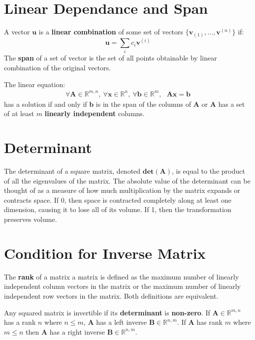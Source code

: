\documentclass[12pt]{report}
\begin{document}
    \section{Linear Dependance and Span}
        A vector $\boldsymbol{u}$ is a \textbf{linear combination} of some set of vectors $\{\boldsymbol{v}_{(1)}, \dots, \boldsymbol{v}^{(n)}\}$ if:
        \begin{equation}
            \boldsymbol{u} = \sum_{i}{c_i \boldsymbol{v}^(i)}
        \end{equation}
        The \textbf{span} of a set of vector is the set of all points obtainable by linear combination of the original vectors.
        
        The linear equation:
        \begin{align}
            \forall \boldsymbol{A} \in \mathbb{R}^{m,n},~
            \forall \boldsymbol{x} \in \mathbb{R}^{n},~ \forall \boldsymbol{b} \in \mathbb{R}^{m},~~~\boldsymbol{A}\boldsymbol{x} = \boldsymbol{b}
        \end{align}
        has a solution if and only if $\boldsymbol{b}$ is in the span of the columns of $\boldsymbol{A}$ or $\boldsymbol{A}$ has a set of at least $m$ \textbf{linearly independent} columns.
        
    \section{Determinant}
        The determinant of a square matrix, denoted $\textbf{det}(\boldsymbol{A})$, is equal to the product of all the eigenvalues of the matrix. The absolute value of the determinant can be thought of as a measure of how much multiplication by the matrix expands or contracts space. If 0, then space is contracted completely along at least one dimension, causing it to lose all of its volume. If 1, then the transformation preserves volume.

    
    \section{Condition for Inverse Matrix}    
        The \textbf{rank} of a matrix a matrix is defined as the maximum number of linearly independent column vectors in the matrix or the maximum number of linearly independent row vectors in the matrix. Both definitions are equivalent.
        
        Any squared matrix is invertible if its \textbf{determinant} is \textbf{non-zero}.
        If $\boldsymbol{A} \in \mathbb{R}^{m,n}$ has a rank $n$ where $n \leq m$, $\boldsymbol{A}$ has a left inverse $\boldsymbol{B} \in \mathbb{R}^{n,m}$. If $\boldsymbol{A}$ has rank $m$ where $m \leq n$ then $\boldsymbol{A}$ has a right inverse $\boldsymbol{B} \in \mathbb{R}^{n,m}$.
        
\end{document}

